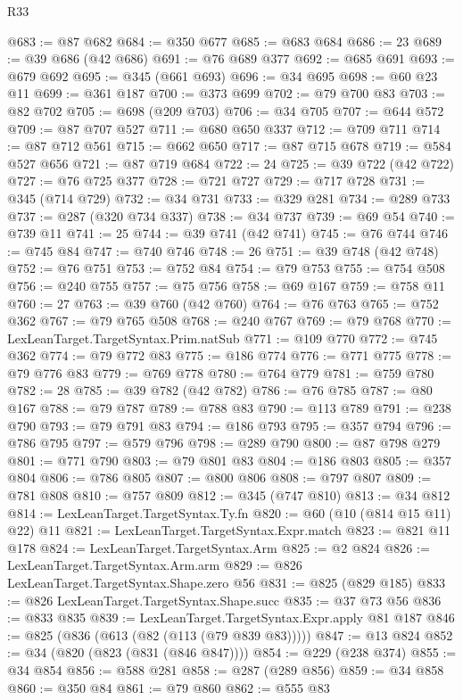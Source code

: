 \begin{lexlean}{R33}
\begin{coremodule}
@683 := @87 @682
@684 := @350 @677
@685 := @683 @684
@686 := 23
@689 := @39 @686 (@42 @686)
@691 := @76 @689 @377
@692 := @685 @691
@693 := @679 @692
@695 := @345 (@661 @693)
@696 := @34 @695
@698 := @60 @23 @11
@699 := @361 @187
@700 := @373 @699
@702 := @79 @700 @83
@703 := @82 @702
@705 := @698 (@209 @703)
@706 := @34 @705
@707 := @644 @572
@709 := @87 @707 @527
@711 := @680 @650 @337
@712 := @709 @711
@714 := @87 @712 @561
@715 := @662 @650
@717 := @87 @715 @678
@719 := @584 @527 @656
@721 := @87 @719 @684
@722 := 24
@725 := @39 @722 (@42 @722)
@727 := @76 @725 @377
@728 := @721 @727
@729 := @717 @728
@731 := @345 (@714 @729)
@732 := @34 @731
@733 := @329 @281
@734 := @289 @733
@737 := @287 (@320 @734 @337)
@738 := @34 @737
@739 := @69 @54
@740 := @739 @11
@741 := 25
@744 := @39 @741 (@42 @741)
@745 := @76 @744
@746 := @745 @84
@747 := @740 @746
@748 := 26
@751 := @39 @748 (@42 @748)
@752 := @76 @751
@753 := @752 @84
@754 := @79 @753
@755 := @754 @508
@756 := @240 @755
@757 := @75 @756
@758 := @69 @167
@759 := @758 @11
@760 := 27
@763 := @39 @760 (@42 @760)
@764 := @76 @763
@765 := @752 @362
@767 := @79 @765 @508
@768 := @240 @767
@769 := @79 @768
@770 := LexLeanTarget.TargetSyntax.Prim.natSub
@771 := @109 @770
@772 := @745 @362
@774 := @79 @772 @83
@775 := @186 @774
@776 := @771 @775
@778 := @79 @776 @83
@779 := @769 @778
@780 := @764 @779
@781 := @759 @780
@782 := 28
@785 := @39 @782 (@42 @782)
@786 := @76 @785
@787 := @80 @167
@788 := @79 @787
@789 := @788 @83
@790 := @113 @789
@791 := @238 @790
@793 := @79 @791 @83
@794 := @186 @793
@795 := @357 @794
@796 := @786 @795
@797 := @579 @796
@798 := @289 @790
@800 := @87 @798 @279
@801 := @771 @790
@803 := @79 @801 @83
@804 := @186 @803
@805 := @357 @804
@806 := @786 @805
@807 := @800 @806
@808 := @797 @807
@809 := @781 @808
@810 := @757 @809
@812 := @345 (@747 @810)
@813 := @34 @812
@814 := LexLeanTarget.TargetSyntax.Ty.fn
@820 := @60 (@10 (@814 @15 @11) @22) @11
@821 := LexLeanTarget.TargetSyntax.Expr.match
@823 := @821 @11 @178
@824 := LexLeanTarget.TargetSyntax.Arm
@825 := @2 @824
@826 := LexLeanTarget.TargetSyntax.Arm.arm
@829 := @826 LexLeanTarget.TargetSyntax.Shape.zero @56
@831 := @825 (@829 @185)
@833 := @826 LexLeanTarget.TargetSyntax.Shape.succ
@835 := @37 @73 @56
@836 := @833 @835
@839 := LexLeanTarget.TargetSyntax.Expr.apply @81 @187
@846 := @825 (@836 (@613 (@82 (@113 (@79 @839 @83)))))
@847 := @13 @824
@852 := @34 (@820 (@823 (@831 (@846 @847))))
@854 := @229 (@238 @374)
@855 := @34 @854
@856 := @588 @281
@858 := @287 (@289 @856)
@859 := @34 @858
@860 := @350 @84
@861 := @79 @860
@862 := @555 @83

\end{coremodule}
\end{lexlean}
